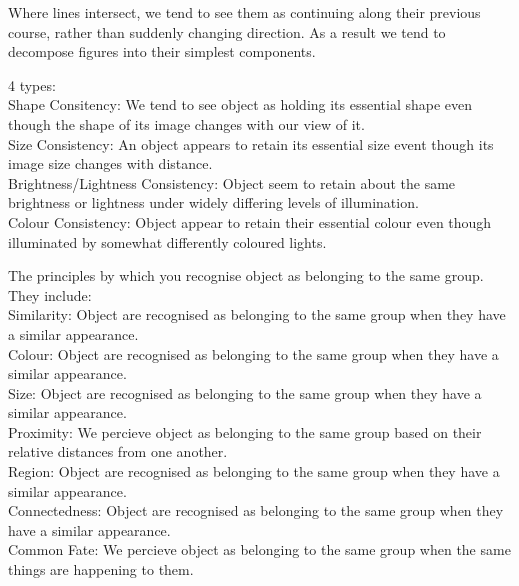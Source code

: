 \begin{definition}
	Where lines intersect, we tend to see them as continuing along their previous course, rather than suddenly changing direction. As a result we tend to decompose figures into their simplest components.
\end{definition}

\begin{definition}
	4 types:\\
	Shape Consitency: We tend to see object as holding its essential shape even though the shape of its image changes with our view of it.\\
	Size Consistency: An object appears to retain its essential size event though its image size changes with distance.\\
	Brightness/Lightness Consistency: Object seem to retain about the same brightness or lightness under widely differing levels of illumination.\\
	Colour Consistency: Object appear to retain their essential colour even though illuminated by somewhat differently coloured lights.
\end{definition}

\begin{definition}
	The principles by which  you recognise object as belonging to the same group. They include:\\
	Similarity: Object are recognised as belonging to the same group when they have a similar appearance.\\
	Colour: Object are recognised as belonging to the same group when they have a similar appearance.\\
	Size: Object are recognised as belonging to the same group when they have a similar appearance.\\
	Proximity: We percieve object as belonging to the same group based on their relative distances from one another. \\
	Region: Object are recognised as belonging to the same group when they have a similar appearance.\\
	Connectedness: Object are recognised as belonging to the same group when they have a similar appearance.\\
	Common Fate: We percieve object as belonging to the same group when the same things are happening to them.
\end{definition}

